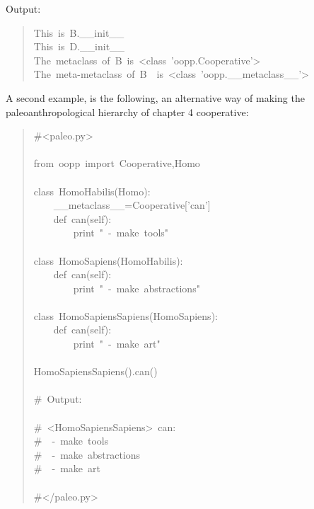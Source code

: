 \documentclass[10pt,english]{article}
\begin{document}
Output:
\begin{quote}
\begin{ttfamily}\begin{flushleft}
\mbox{This~is~B.{\_}{\_}init{\_}{\_}}\\
\mbox{This~is~D.{\_}{\_}init{\_}{\_}}\\
\mbox{The~metaclass~of~B~is~<class~'oopp.Cooperative'>}\\
\mbox{The~meta-metaclass~of~B~~is~<class~'oopp.{\_}{\_}metaclass{\_}{\_}'>}
\end{flushleft}\end{ttfamily}
\end{quote}

A second example, is the following, an alternative way of
making the paleoanthropological hierarchy of chapter 4 cooperative:
\begin{quote}
\begin{ttfamily}\begin{flushleft}
\mbox{{\#}<paleo.py>}\\
\mbox{}\\
\mbox{from~oopp~import~Cooperative,Homo}\\
\mbox{}\\
\mbox{class~HomoHabilis(Homo):}\\
\mbox{~~~~{\_}{\_}metaclass{\_}{\_}=Cooperative['can']}\\
\mbox{~~~~def~can(self):}\\
\mbox{~~~~~~~~print~"~-~make~tools"}\\
\mbox{}\\
\mbox{class~HomoSapiens(HomoHabilis):}\\
\mbox{~~~~def~can(self):}\\
\mbox{~~~~~~~~print~"~-~make~abstractions"}\\
\mbox{~~~~}\\
\mbox{class~HomoSapiensSapiens(HomoSapiens):}\\
\mbox{~~~~def~can(self):}\\
\mbox{~~~~~~~~print~"~-~make~art"}\\
\mbox{}\\
\mbox{HomoSapiensSapiens().can()}\\
\mbox{}\\
\mbox{{\#}~Output:}\\
\mbox{}\\
\mbox{{\#}~<HomoSapiensSapiens>~can:}\\
\mbox{{\#}~~-~make~tools}\\
\mbox{{\#}~~-~make~abstractions}\\
\mbox{{\#}~~-~make~art}\\
\mbox{}\\
\mbox{{\#}</paleo.py>}
\end{flushleft}\end{ttfamily}
\end{quote}
\end{document}
